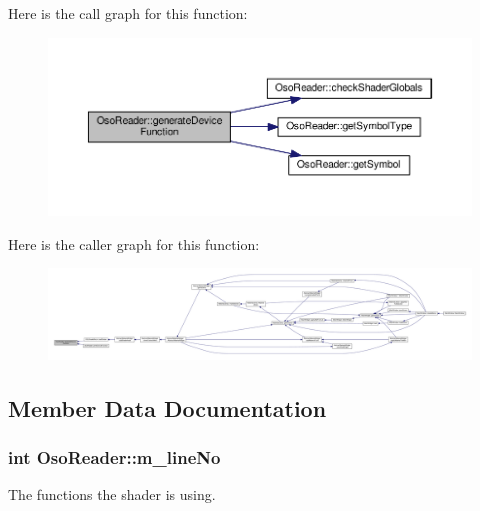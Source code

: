 Here is the call graph for this function\-:
\nopagebreak
\begin{figure}[H]
\begin{center}
\leavevmode
\includegraphics[width=350pt]{class_oso_reader_a73b356139df5730e756f2366ec1e1924_cgraph}
\end{center}
\end{figure}




Here is the caller graph for this function\-:
\nopagebreak
\begin{figure}[H]
\begin{center}
\leavevmode
\includegraphics[width=350pt]{class_oso_reader_a73b356139df5730e756f2366ec1e1924_icgraph}
\end{center}
\end{figure}




\subsection{Member Data Documentation}
\hypertarget{class_oso_reader_a2573c4b6a21a1db045eba041ed52b321}{
\subsubsection[{m\-\_\-line\-No}]{\setlength{\rightskip}{0pt plus 5cm}int Oso\-Reader\-::m\-\_\-line\-No\hspace{0.3cm}{\ttfamily [private]}}}\label{class_oso_reader_a2573c4b6a21a1db045eba041ed52b321}


The functions the shader is using. 

